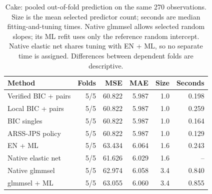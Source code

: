 \begin{table}[H]\centering\small
\begin{tabular}{lrrrrr}\toprule
Method & Folds & MSE & MAE & Size & Seconds\\\midrule
Verified BIC + pairs & 5/5 & 60.822 & 5.987 & 1.0 & 0.198\\
Local BIC + pairs & 5/5 & 60.822 & 5.987 & 1.0 & 0.259\\
BIC singles & 5/5 & 60.822 & 5.987 & 1.0 & 0.164\\
ARSS-JPS policy & 5/5 & 60.822 & 5.987 & 1.0 & 0.129\\
EN + ML & 5/5 & 63.434 & 6.064 & 1.6 & 0.243\\
Native elastic net & 5/5 & 61.626 & 6.029 & 1.6 & --\\
Native glmmsel & 5/5 & 62.974 & 6.058 & 3.4 & 0.840\\
glmmsel + ML & 5/5 & 63.055 & 6.060 & 3.4 & 0.855\\
\bottomrule\end{tabular}
\caption{Cake: pooled out-of-fold prediction on the same 270 observations. Size is the mean selected predictor count; seconds are median fitting-and-tuning times. Native glmmsel allows selected random slopes; its ML refit uses only the reference random intercept. Native elastic net shares tuning with EN + ML, so no separate time is assigned. Differences between dependent folds are descriptive.}
\end{table}
